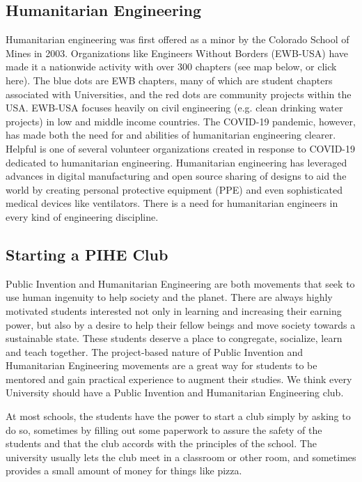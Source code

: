 \documentclass[
	fontsize=10pt, %
	twoside=false, %
	secnumdepth=1, %
]{kaobook}
\begin{document}


\subsection{Humanitarian Engineering}

Humanitarian engineering was first offered as a minor by the Colorado School of Mines in 2003. Organizations like Engineers Without Borders (EWB-USA) have made it a nationwide activity with over 300 chapters (see map below, or click here). The blue dots are EWB chapters, many of which are student chapters associated with Universities, and the red dots are community projects within the USA. EWB-USA focuses heavily on civil engineering (e.g. clean drinking water projects) in low and middle income countries. The COVID-19 pandemic, however, has made both the need for and abilities of humanitarian engineering clearer. Helpful is one of several volunteer organizations created in response to COVID-19 dedicated to humanitarian engineering. Humanitarian engineering has leveraged advances in digital manufacturing and open source sharing of designs to aid the world by creating personal protective equipment (PPE) and even sophisticated medical devices like ventilators. There is a need for humanitarian engineers in every kind of engineering discipline.

\subsection{Starting a PIHE Club}

Public Invention and Humanitarian Engineering are both movements that seek to use human ingenuity to help society and the planet. There are always highly motivated students interested not only in learning and increasing their earning power, but also by a desire to help their fellow beings and move society towards a sustainable state. These students deserve a place to congregate, socialize, learn and teach together. The project-based nature of Public Invention and Humanitarian Engineering movements are a great way for students to be mentored and gain practical experience to augment their studies. We think every University should have a Public Invention and Humanitarian Engineering club.

At most schools, the students have the power to start a club simply by asking to do so, sometimes by filling out some paperwork to assure the safety of the students and that the club accords with the principles of the school. The university usually lets the club meet in a classroom or other room, and sometimes provides a small amount of money for things like pizza.
\end{document}
